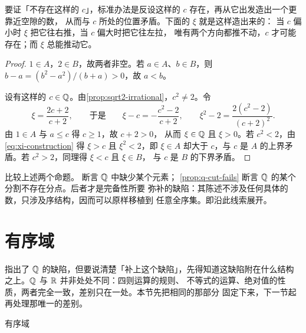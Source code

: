 \begin{strategy}
  要证「不存在这样的 \(c\)」，标准办法是反设这样的 \(c\) 存在，再从它出发造出一个更靠近空隙的数，
  从而与 \(c\) 所处的位置矛盾。下面的 \(\xi\) 就是这样造出来的：
  当 \(c\) 偏小时 \(\xi\) 把它往右推，当 \(c\) 偏大时把它往左拉，
  唯有两个方向都推不动，\(c\) 才可能存在；而 \(\xi\) 总能推动它。
\end{strategy}

\begin{proof}
  \(1 \in A\)，\(2 \in B\)，故两者非空。若 \(a \in A\)、\(b \in B\)，则
  \(b - a = (b^{2} - a^{2})/(b + a) > 0\)，故 \(a < b\)。

  设有这样的 \(c \in \mathbb{Q}\)。由\cref{prop:sqrt2-irrational}，\(c^{2} \neq 2\)。令
  \begin{equation}
    \label{eq:xi-construction}
    \xi = \frac{2c + 2}{c + 2},
    \qquad\text{于是}\qquad
    \xi - c = -\frac{c^{2} - 2}{c + 2},
    \qquad
    \xi^{2} - 2 = \frac{2(c^{2} - 2)}{(c + 2)^{2}}.
  \end{equation}
  由 \(1 \in A\) 与 \(a \le c\) 得 \(c \ge 1\)，故 \(c + 2 > 0\)，
  从而 \(\xi \in \mathbb{Q}\) 且 \(\xi > 0\)。若 \(c^{2} < 2\)，由\cref{eq:xi-construction}
  得 \(\xi > c\) 且 \(\xi^{2} < 2\)，即 \(\xi \in A\) 却大于 \(c\)，与 \(c\) 是 \(A\)
  的上界矛盾。若 \(c^{2} > 2\)，同理得 \(\xi < c\) 且 \(\xi \in B\)，
  与 \(c\) 是 \(B\) 的下界矛盾。
\end{proof}

\begin{remark}
  比较上述两个命题。 断言 \(\mathbb{Q}\) 中缺少某个元素；
  \cref{prop:q-cut-fails} 断言 \(\mathbb{Q}\) 的某个分割不存在分点。后者才是完备性所要
  弥补的缺陷：其陈述不涉及任何具体的数，只涉及序结构，因而可以原样移植到
  任意全序集。即沿此线索展开。
\end{remark}

\section{有序域}
\label{sec:ordered-field}

 指出了 \(\mathbb{Q}\) 的缺陷，但要说清楚「补上这个缺陷」，先得知道这缺陷附在什么结构之上。\(\mathbb{Q}\) 与 \(\mathbb{R}\) 并非处处不同：四则运算的规则、
不等式的运算、绝对值的性质，两者完全一致，差别只在一处。本节先把相同的那部分
固定下来，下一节起再处理那唯一的差别。

\begin{concept}{有序域}
\end{concept}

